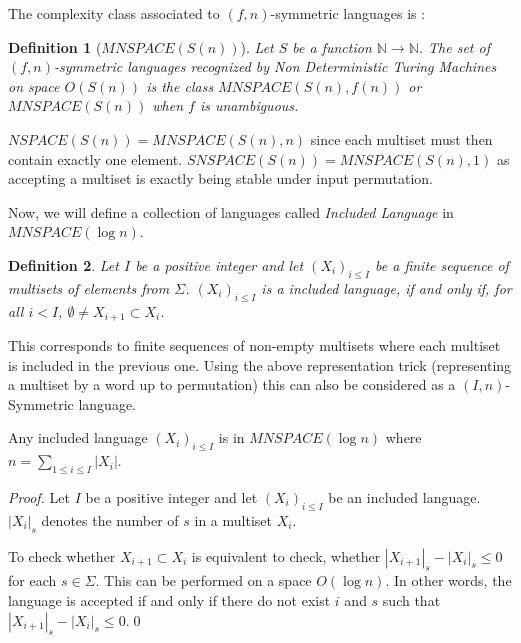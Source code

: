 \documentclass[UKenglish]{llncs}
\newtheorem{define}{Definition}
\newcommand\motnouv[1]{{\emph{#1}}}
\begin{document}
The complexity class associated to   $(f,n)$-symmetric languages is :


\begin{define}[$MNSPACE(S(n))$]
Let $S$ be a function 
$\mathbb{N}\to \mathbb{N}$. The set of $(f,n)$-symmetric languages recognized by Non Deterministic
Turing Machines on  space $O(S(n))$ is the class   \motnouv{$MNSPACE(S(n),f(n))$}
 or  \motnouv{$MNSPACE(S(n))$} when $f$ is unambiguous.
\end{define}


\begin{remark} $NSPACE(S(n))=MNSPACE(S(n),n)$ since each multiset
must then contain exactly one element.
     $SNSPACE(S(n))=MNSPACE(S(n),1)$  as accepting a multiset
is exactly being stable under input permutation.
\end{remark}

Now, we will define a collection of languages called \emph{Included Language} in $MNSPACE(\log n)$. 

\begin{define}
Let $I$ be a positive integer and let $(X_i)_{i\le I}$ be a finite
sequence of multisets of elements from $\Sigma$.
$(X_i)_{i\le I}$ is a  \motnouv{included language}, if and only if, for all $i<I$, $\emptyset\ne X_{i+1}\subset X_{i}$.
\end{define}

This corresponds to finite sequences of non-empty multisets where each
multiset is included in the previous one. Using the above
representation trick (representing a multiset by a word up to
permutation) this can also be considered as a $(I,n)$-Symmetric
language.


\begin{proposition}
Any included language $(X_i)_{i\le I}$ is in $MNSPACE(\log n)$ where $\displaystyle n = \sum_{1 \le i \le I} |X_{i}|$.
\end{proposition}
\begin{proof}
Let $I$ be a positive integer and let $(X_i)_{i\le I}$ be an included language.
$|X_i|_s$ denotes the number of $s$ in a multiset $X_i$. 

To check whether  $X_{i+1}\subset X_i$ is equivalent to check, whether $|X_{i+1}|_s-|X_{i}|_s\le0$
for each $s\in\Sigma$. 
This can be performed on a space $O(\log n)$. 
In other words,  the language is accepted if and only if there do not exist $i$ and $s$ such that
$|X_{i+1}|_s-|X_{i}|_s\le0$.\hfill \qed

\end{proof}
\end{document}

